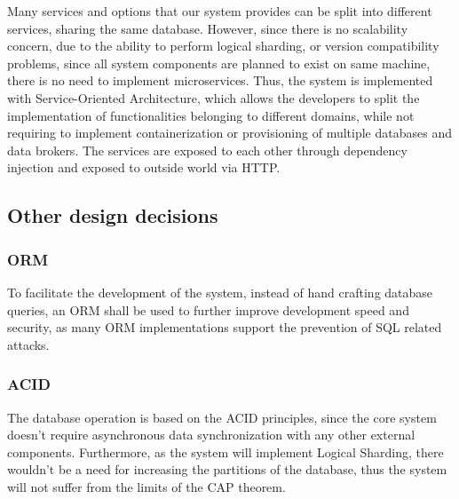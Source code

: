 
Many services and options that our system provides can be split into different services, sharing the same database.
However, since there is no scalability concern, due to the ability to perform logical sharding, or version compatibility problems, since all system components are planned to exist on same machine, there is no need to implement microservices.
Thus, the system is implemented with Service-Oriented Architecture, which allows the developers to split the implementation of functionalities belonging to different domains, while not requiring to implement containerization or provisioning of multiple databases and data brokers.
The services are exposed to each other through dependency injection and exposed to outside world via HTTP.

\subsection{Other design decisions} %
\subsubsection{ORM}

To facilitate the development of the system, instead of hand crafting database queries, an ORM shall be used to further improve development speed and security, as many ORM implementations support the prevention of SQL related attacks.

\subsubsection{ACID}

The database operation is based on the ACID principles, since the core system doesn't require asynchronous data synchronization with any other external components.
Furthermore, as the system will implement Logical Sharding, there wouldn't be a need for increasing the partitions of the database, thus the system will not suffer from the limits of the CAP theorem.


